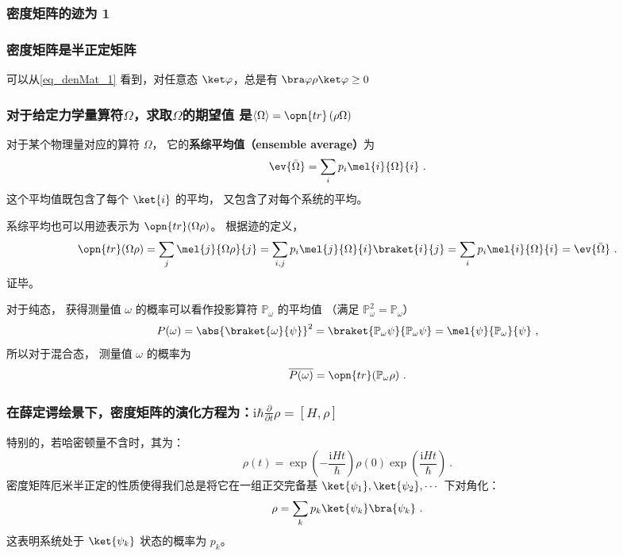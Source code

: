 \subsubsection{密度矩阵的迹为 1}

\subsubsection{密度矩阵是半正定矩阵}

可以从\autoref{eq_denMat_1} 看到，对任意态 $\ket\varphi$，总是有 
    $\bra\varphi \rho \ket\varphi\ge 0$

    
\subsubsection{对于给定力学量算符$\Omega$，求取$\Omega$的期望值
    是$\left\langle \Omega \right\rangle = \opn{tr}\left(\rho\Omega\right)$}
    
    对于某个物理量对应的算符 $\Omega$， 它的\textbf{系综平均值（ensemble average）}为
    \begin{equation}
    \ev{\bar\Omega} = \sum_i p_i \mel{i}{\Omega}{i}~.
    \end{equation}
    这个平均值既包含了每个 $\ket{i}$ 的平均， 又包含了对每个系统的平均。

    系综平均也可以用迹表示为 $\opn{tr}(\Omega\rho)$。 根据迹的定义，
    \begin{equation}\label{eq_denMat_3}
    \opn{tr}(\Omega\rho) = \sum_j \mel{j}{\Omega\rho}{j} = \sum_{i,j} p_i\mel{j}{\Omega}{i} \braket{i}{j} = \sum_{i} p_i\mel{i}{\Omega}{i} = \ev{\bar\Omega}~.
    \end{equation}
    证毕。

    对于纯态， 获得测量值 $\omega$ 的概率可以看作投影算符 $\mathbb P_\omega$ 的平均值
    （满足 $\mathbb P_\omega^2 = \mathbb P_\omega$）
    \begin{equation}
    P(\omega) = \abs{\braket{\omega}{\psi}}^2 = \braket{\mathbb P_\omega \psi}{\mathbb P_\omega \psi} = \mel{\psi}{\mathbb P_\omega}{\psi}~,
    \end{equation}
    所以对于混合态， 测量值 $\omega$ 的概率为
    \begin{equation}
\overline{P(\omega)} = \opn{tr}(\mathbb P_\omega\rho)~.
\end{equation}

\subsubsection{在薛定谔绘景下，密度矩阵的演化方程为：$\mathrm{i}\hbar \frac{\partial}{\partial t} \rho = \left[ H, \rho \right]$}
    特别的，若哈密顿量不含时，其为：
    $$\rho \left( t \right) = \exp\left(-\frac{\mathrm{i}Ht}{\hbar}\right) \rho \left(0\right) \exp\left(\frac{\mathrm{i}Ht}{\hbar}\right)~.$$
    密度矩阵厄米半正定的性质使得我们总是将它在一组正交完备基 $\ket{\psi_1},\ket{\psi_2},\cdots$ 下对角化：
    \begin{equation}
    \rho = \sum\limits_k p_k\ket{\psi_k} \bra{\psi_k}~.
    \end{equation}
    这表明系统处于 $\ket{\psi_k}$ 状态的概率为 $p_k$。

